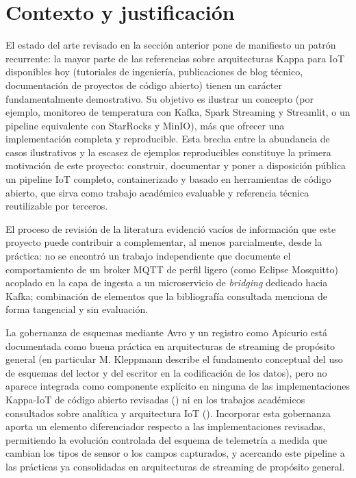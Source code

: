 \section{Contexto y justificación}

El estado del arte revisado en la sección anterior pone de manifiesto un patrón recurrente: la mayor parte de las referencias sobre arquitecturas Kappa para IoT disponibles hoy (tutoriales de ingeniería, publicaciones de blog técnico, documentación de proyectos de código abierto) tienen un carácter fundamentalmente demostrativo. Su objetivo es ilustrar un concepto (por ejemplo, monitoreo de temperatura con Kafka, Spark Streaming y Streamlit, o un pipeline equivalente con StarRocks y MinIO), más que ofrecer una implementación completa y reproducible. Esta brecha entre la abundancia de casos ilustrativos y la escasez de ejemplos reproducibles constituye la primera motivación de este proyecto: construir, documentar y poner a disposición pública un pipeline IoT completo, containerizado y basado en herramientas de código abierto, que sirva como trabajo académico evaluable y referencia técnica reutilizable por terceros.

El proceso de revisión de la literatura evidenció vacíos de información que este proyecto puede contribuir a complementar, al menos parcialmente, desde la práctica: no se encontró un trabajo independiente que documente el comportamiento de un broker MQTT de perfil ligero (como Eclipse Mosquitto) acoplado en la capa de ingesta a un microservicio de \textit{bridging} dedicado hacia Kafka; combinación de elementos que la bibliografía consultada menciona de forma tangencial y sin evaluación.

La gobernanza de esquemas mediante Avro y un registro como Apicurio está documentada como buena práctica en arquitecturas de streaming de propósito general (en particular M. Kleppmann \cite{kleppmann2017} describe el fundamento conceptual del uso de esquemas del lector y del escritor en la codificación de los datos), pero no aparece integrada como componente explícito en ninguna de las implementaciones Kappa-IoT de código abierto revisadas (\cite{shinde2025,zefkilis2025}) ni en los trabajos académicos consultados sobre analítica y arquitectura IoT (\cite{liu2025,dominguez2022,caowachowicz2019}). Incorporar esta gobernanza aporta un elemento diferenciador respecto a las implementaciones revisadas, permitiendo la evolución controlada del esquema de telemetría a medida que cambian los tipos de sensor o los campos capturados, y acercando este pipeline a las prácticas ya consolidadas en arquitecturas de streaming de propósito general.

